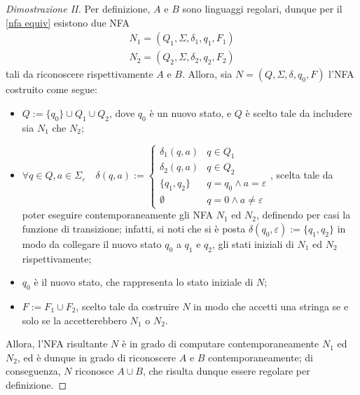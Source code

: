 \documentclass[a4paper, 12pt]{report}
\begin{document}
    \begin{proof}[Dimostrazione II]
        Per definizione, $A$ e $B$ sono linguaggi regolari, dunque per il \cref{nfa equiv} esistono due NFA $$\left. \begin{array}{c}N_1 = (Q_1, \Sigma, \delta_1, q_1, F_1) \\ N_2 = (Q_2, \Sigma, \delta_2, q_2, F_2) \end{array} \right.$$ tali da riconoscere rispettivamente $A$ e $B$. Allora, sia $N = (Q, \Sigma, \delta, q_0, F)$ l'NFA costruito come segue:

        \begin{itemize}
            \item $Q := \{q_0\} \cup Q_1 \cup Q_2$, dove $q_0$ è un nuovo stato, e $Q$ è scelto tale da includere sia $N_1$ che $N_2$;
            \item $\forall q \in Q, a \in \Sigma_{\varepsilon} \quad \delta(q, a) := \left \{ \begin{array}{ll} \delta_1(q, a) & q \in Q_1 \\ \delta_2(q, a) & q \in Q_2 \\ \{q_1, q_2\} & q = q_0 \land a = \varepsilon \\ \emptyset & q = 0 \land a \neq \varepsilon \end{array} \right.$, scelta tale da poter eseguire contemporaneamente gli NFA $N_1$ ed $N_2$, definendo per casi la funzione di transizione; infatti, si noti che si è posta $\delta(q_0, \varepsilon) := \{q_1, q_2\}$ in modo da collegare il nuovo stato $q_0$ a $q_1$ e $q_2$, gli stati iniziali di $N_1$ ed $N_2$ rispettivamente;
            \item $q_0$ è il nuovo stato, che rappresenta lo stato iniziale di $N$;
            \item $F := F_1 \cup F_2$, scelto tale da costruire $N$ in modo che accetti una stringa se e solo se la accetterebbero $N_1$ o $N_2$.
        \end{itemize}

        Allora, l'NFA risultante $N$ è in grado di computare contemporaneamente $N_1$ ed $N_2$, ed è dunque in grado di riconoscere $A$ e $B$ contemporaneamente; di conseguenza, $N$ riconosce $A \cup B$, che risulta dunque essere regolare per definizione.


\end{proof}
\end{document}
